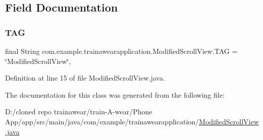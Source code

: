 \subsection{Field Documentation}
\mbox{\label{classcom_1_1example_1_1trainawearapplication_1_1_modified_scroll_view_aa8c3ba8f3bb238ac0f2d56e82757814a}} 
\subsubsection{\texorpdfstring{TAG}{TAG}}
{\footnotesize\ttfamily final String com.\+example.\+trainawearapplication.\+Modified\+Scroll\+View.\+T\+AG = \char`\"{}Modified\+Scroll\+View\char`\"{}\hspace{0.3cm}{\ttfamily [static]}, {\ttfamily [private]}}



Definition at line 15 of file Modified\+Scroll\+View.\+java.



The documentation for this class was generated from the following file\+:\begin{DoxyCompactItemize}
\item 
D\+:/cloned repo trainawear/train-\/\+A-\/wear/\+Phone App/app/src/main/java/com/example/trainawearapplication/\mbox{\hyperlink{_modified_scroll_view_8java}{Modified\+Scroll\+View.\+java}}\end{DoxyCompactItemize}
